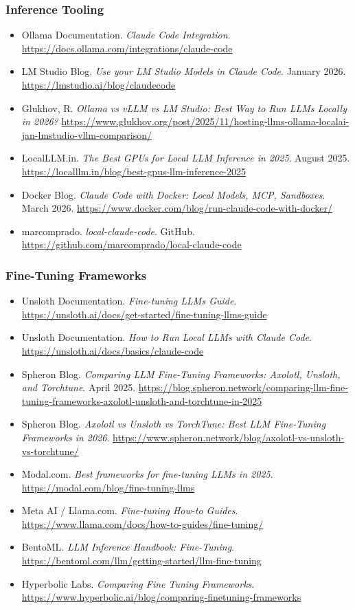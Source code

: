 \documentclass[11pt,letterpaper]{article}
\begin{document}
\subsubsection{Inference Tooling}
\begin{itemize}[leftmargin=*]
  \item Ollama Documentation. \textit{Claude Code Integration}. \url{https://docs.ollama.com/integrations/claude-code}
  \item LM Studio Blog. \textit{Use your LM Studio Models in Claude Code}. January 2026. \url{https://lmstudio.ai/blog/claudecode}
  \item Glukhov, R. \textit{Ollama vs vLLM vs LM Studio: Best Way to Run LLMs Locally in 2026?} \url{https://www.glukhov.org/post/2025/11/hosting-llms-ollama-localai-jan-lmstudio-vllm-comparison/}
  \item LocalLLM.in. \textit{The Best GPUs for Local LLM Inference in 2025}. August 2025. \url{https://localllm.in/blog/best-gpus-llm-inference-2025}
  \item Docker Blog. \textit{Claude Code with Docker: Local Models, MCP, Sandboxes}. March 2026. \url{https://www.docker.com/blog/run-claude-code-with-docker/}
  \item marcomprado. \textit{local-claude-code}. GitHub. \url{https://github.com/marcomprado/local-claude-code}
\end{itemize}

\subsubsection{Fine-Tuning Frameworks}
\begin{itemize}[leftmargin=*]
  \item Unsloth Documentation. \textit{Fine-tuning LLMs Guide}. \url{https://unsloth.ai/docs/get-started/fine-tuning-llms-guide}
  \item Unsloth Documentation. \textit{How to Run Local LLMs with Claude Code}. \url{https://unsloth.ai/docs/basics/claude-code}
  \item Spheron Blog. \textit{Comparing LLM Fine-Tuning Frameworks: Axolotl, Unsloth, and Torchtune}. April 2025. \url{https://blog.spheron.network/comparing-llm-fine-tuning-frameworks-axolotl-unsloth-and-torchtune-in-2025}
  \item Spheron Blog. \textit{Axolotl vs Unsloth vs TorchTune: Best LLM Fine-Tuning Frameworks in 2026}. \url{https://www.spheron.network/blog/axolotl-vs-unsloth-vs-torchtune/}
  \item Modal.com. \textit{Best frameworks for fine-tuning LLMs in 2025}. \url{https://modal.com/blog/fine-tuning-llms}
  \item Meta AI / Llama.com. \textit{Fine-tuning How-to Guides}. \url{https://www.llama.com/docs/how-to-guides/fine-tuning/}
  \item BentoML. \textit{LLM Inference Handbook: Fine-Tuning}. \url{https://bentoml.com/llm/getting-started/llm-fine-tuning}
  \item Hyperbolic Labs. \textit{Comparing Fine Tuning Frameworks}. \url{https://www.hyperbolic.ai/blog/comparing-finetuning-frameworks}
\end{itemize}
\end{document}
